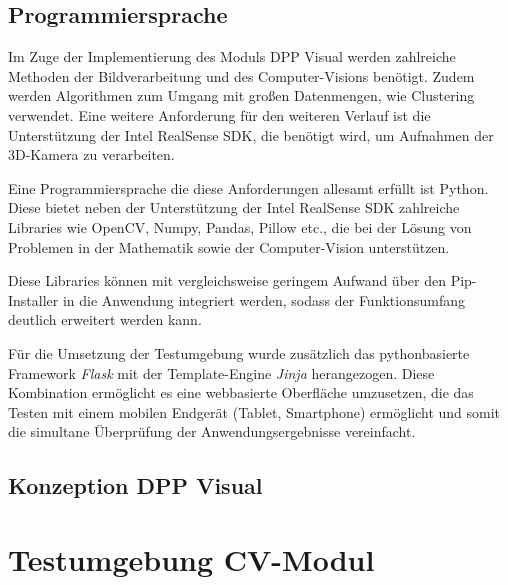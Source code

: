 \documentclass[
    type=Projektarbeit,
    status=draft, %
    language=german, %
    bibengine=bibtex,
]{unibwm-inf-thesis}
\begin{document}
    \section{Programmiersprache}
    Im Zuge der Implementierung des Moduls DPP Visual werden zahlreiche Methoden der Bildverarbeitung und des
    Computer-Visions benötigt.
    Zudem werden Algorithmen zum Umgang mit großen Datenmengen, wie Clustering verwendet.
    Eine weitere Anforderung für den weiteren Verlauf ist die Unterstützung der Intel RealSense SDK, die benötigt wird,
    um Aufnahmen der 3D-Kamera zu verarbeiten.

    Eine Programmiersprache die diese Anforderungen allesamt erfüllt ist Python.
    Diese bietet neben der Unterstützung der Intel RealSense SDK zahlreiche Libraries wie OpenCV, Numpy, Pandas,
    Pillow etc., die bei der Lösung von Problemen in der Mathematik sowie der Computer-Vision unterstützen.

    Diese Libraries können mit vergleichsweise geringem Aufwand über den Pip-Installer in die Anwendung integriert
    werden, sodass der Funktionsumfang deutlich erweitert werden kann.

    Für die Umsetzung der Testumgebung wurde zusätzlich das pythonbasierte Framework \textit{Flask} mit der
    Template-Engine \textit{Jinja} herangezogen.
    Diese Kombination ermöglicht es eine webbasierte Oberfläche umzusetzen, die das Testen mit einem mobilen Endgerät
    (Tablet, Smartphone) ermöglicht und somit die simultane Überprüfung der Anwendungsergebnisse vereinfacht.


    \section{Konzeption DPP Visual}


    \chapter{Testumgebung CV-Modul}



    
    \backmatter
    
    
\end{document}
